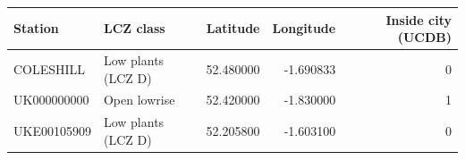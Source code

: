 \begin{tabular}{llrrr}
\toprule
Station & LCZ class & Latitude & Longitude & Inside city (UCDB) \\
\midrule
COLESHILL & Low plants (LCZ D) & 52.480000 & -1.690833 & 0 \\
UK000000000 & Open lowrise & 52.420000 & -1.830000 & 1 \\
UKE00105909 & Low plants (LCZ D) & 52.205800 & -1.603100 & 0 \\
\bottomrule
\end{tabular}
